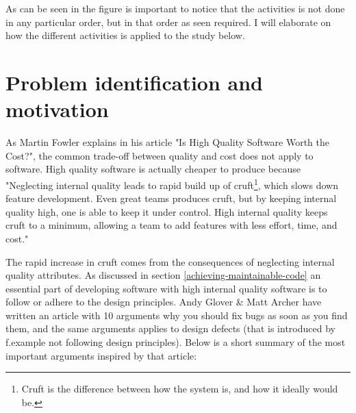 \documentclass{report}
\begin{document}
As can be seen in the figure is important to notice that the activities is not done in any particular order, but in that order as seen required. I will elaborate on how the different activities is applied to the study below. 

\section{Problem identification and motivation}
\label{problem-identification-and-motiviation}


As Martin Fowler explains in his article "Is High Quality Software Worth the Cost?"\cite{is-high-quality-softaware-worth-it}, the common trade-off between quality and cost does not apply to software. High quality software is actually cheaper to produce because "Neglecting internal quality leads to rapid build up of cruft\footnote{Cruft is the difference between how the system is, and how it ideally would be.}, which slows down feature development. Even great teams produces cruft, but by keeping internal quality high, one is able to keep it under control. High internal quality keeps cruft to a minimum, allowing a team to add features with less effort, time, and cost."

The rapid increase in cruft comes from the consequences of neglecting internal quality attributes. As discussed in section \ref{achieving-maintainable-code} an essential part of developing software with high internal quality software is to follow or adhere to the design principles. Andy Glover \& Matt Archer have written an article with 10 arguments why you should fix bugs as soon as you find them\cite{10reasons}, and the same arguments applies to design defects (that is introduced by f.example not following design principles). Below is a short summary of the most important arguments inspired by that article:
\end{document}
